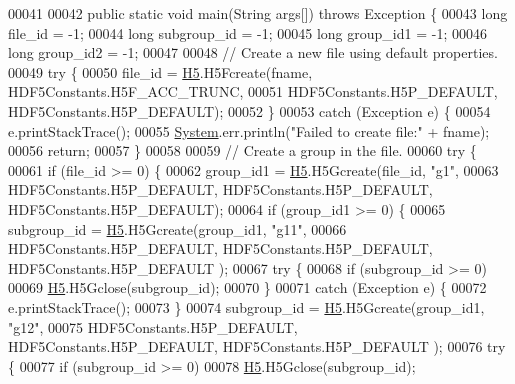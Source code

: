 \begin{DoxyCode}
00041 
00042     \textcolor{keyword}{public} \textcolor{keyword}{static} \textcolor{keywordtype}{void} main(String args[]) \textcolor{keywordflow}{throws} Exception \{
00043         \textcolor{keywordtype}{long} file\_id = -1;
00044         \textcolor{keywordtype}{long} subgroup\_id = -1;
00045         \textcolor{keywordtype}{long} group\_id1 = -1;
00046         \textcolor{keywordtype}{long} group\_id2 = -1;
00047 
00048         \textcolor{comment}{// Create a new file using default properties.}
00049         \textcolor{keywordflow}{try} \{
00050             file\_id = \hyperlink{namespace_h5}{H5}.H5Fcreate(fname, HDF5Constants.H5F\_ACC\_TRUNC,
00051                     HDF5Constants.H5P\_DEFAULT, HDF5Constants.H5P\_DEFAULT);
00052         \}
00053         \textcolor{keywordflow}{catch} (Exception e) \{
00054             e.printStackTrace();
00055             \hyperlink{namespace_system}{System}.err.println(\textcolor{stringliteral}{"Failed to create file:"} + fname);
00056             \textcolor{keywordflow}{return};
00057         \}
00058 
00059         \textcolor{comment}{// Create a group in the file.}
00060         \textcolor{keywordflow}{try} \{
00061             \textcolor{keywordflow}{if} (file\_id >= 0) \{
00062                 group\_id1 = \hyperlink{namespace_h5}{H5}.H5Gcreate(file\_id, \textcolor{stringliteral}{"g1"},
00063                         HDF5Constants.H5P\_DEFAULT, HDF5Constants.H5P\_DEFAULT, HDF5Constants.H5P\_DEFAULT);
00064                 \textcolor{keywordflow}{if} (group\_id1 >= 0) \{
00065                     subgroup\_id = \hyperlink{namespace_h5}{H5}.H5Gcreate(group\_id1, \textcolor{stringliteral}{"g11"},
00066                             HDF5Constants.H5P\_DEFAULT, HDF5Constants.H5P\_DEFAULT, HDF5Constants.H5P\_DEFAULT
      );
00067                     \textcolor{keywordflow}{try} \{
00068                         \textcolor{keywordflow}{if} (subgroup\_id >= 0)
00069                             \hyperlink{namespace_h5}{H5}.H5Gclose(subgroup\_id);
00070                     \}
00071                     \textcolor{keywordflow}{catch} (Exception e) \{
00072                         e.printStackTrace();
00073                     \}
00074                     subgroup\_id = \hyperlink{namespace_h5}{H5}.H5Gcreate(group\_id1, \textcolor{stringliteral}{"g12"},
00075                             HDF5Constants.H5P\_DEFAULT, HDF5Constants.H5P\_DEFAULT, HDF5Constants.H5P\_DEFAULT
      );
00076                     \textcolor{keywordflow}{try} \{
00077                         \textcolor{keywordflow}{if} (subgroup\_id >= 0)
00078                             \hyperlink{namespace_h5}{H5}.H5Gclose(subgroup\_id);

\end{DoxyCode}
